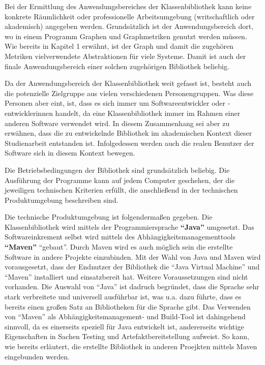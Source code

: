 \documentclass[a4paper,12pt,ngerman,chapterprefix=false,listof=totoc,bibliography=totoc]{scrreprt}
\begin{document}
{{{Bei der Ermittlung des Anwendungsbereiches der Klassenbibliothek kann keine konkrete Räumlichkeit oder professionelle Arbeitsumgebung (writschaftlich oder akademisch) angegeben werden. Grundsätzlich ist der Anwendungsbereich dort, wo in einem Programm Graphen und Graphmetriken genutzt werden müssen. Wie bereits in Kapitel 1 erwähnt, ist der Graph und damit die zugehören Metriken vielverwendete Abstraktionen für viele Systeme. \cite{turau_algorithmische_2004} Damit ist auch der finale Anwendungsbereich einer solchen zugehörigen Bibliothek beliebig.

Da der Anwendungsbereich der Klassenbibliothek weit gefasst ist, besteht auch die potenzielle Zielgruppe aus vielen verschiedenen Personengruppen. Was diese Personen aber eint, ist, dass es sich immer um Softwareentwickler oder -entwicklerinnen handelt, da eine Klassenbibliothek immer im Rahmen einer anderen Software verwendet wird. In diesem Zusammenhang sei aber zu erwähnen, dass die zu entwickelnde Bibliothek im akademischen Kontext dieser Studienarbeit entstanden ist. Infolgedessen werden auch die realen Benutzer der Software sich in diesem Kontext bewegen.

Die Betriebsbedingungen der Bibliothek sind grundsätzlich beliebig. Die Ausführung der Programme kann auf jedem Computer geschehen, der die jeweiligen technischen Kriterien erfüllt, die anschließend in der technischen Produktumgebung beschreiben sind.

Die technische Produktumgebung ist folgendermaßen gegeben. Die Klassenbibliothek wird mittels der Programmiersprache \textbf{"`Java"'} umgesetzt. Das Softwareinkrement selbst wird mittels des Abhängigkeitsmanagementtools \textbf{"`Maven"'} "`gebaut"'. Durch Maven wird es auch möglich sein die erstellte Software in andere Projekte einzubinden.  Mit der Wahl von Java und Maven wird vorausgesetzt, dass der Endnutzer der Bibliothek die "`Java Virtual Machine"' und "`Maven"' installiert und einsatzbereit hat. Weitere Voraussetzungen sind nicht vorhanden. Die Auswahl von "`Java"' ist dadruch begründet, dass die Sprache sehr stark verbreitete und universell ausführbar ist, was u.a. dazu führte, dass es bereits einen großen Satz an Bibliotheken für die Sprache gibt. Das Verwenden von "`Maven"' als Abhängigkeitsmanagement- und Build-Tool ist dahingehend sinnvoll, da es einerseits speziell für Java entwickelt ist, andererseits wichtige Eigenschaften in Sachen Testing und Artefaktbereitstellung aufweist. So kann, wie bereits erläutert, die erstellte Bibliothek in anderen Proejkten mittels Maven eingebunden werden. \cite{ullenboom_java_2016,srirangan_apache_2011}
}
}}
\end{document}
